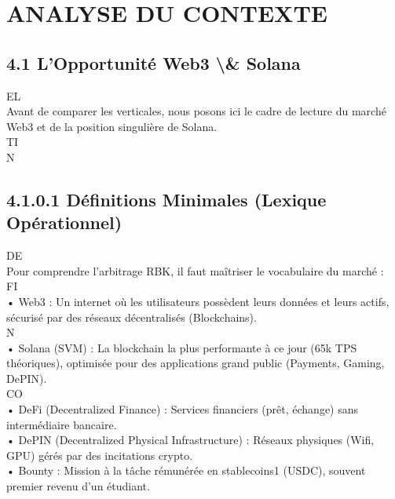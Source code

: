 \documentclass[12pt,landscape,a4paper]{article}
\begin{document}
\section{ANALYSE DU CONTEXTE}
\vspace{0.5em}
\vspace{0.5em}
\subsection{4.1 L’Opportunité Web3 \textbackslash{}& Solana}
\vspace{0.5em}
\vspace{0.5em}
\vspace{0.5em}
\vspace{0.5em}
EL\\
Avant de comparer les verticales, nous posons ici le cadre de lecture du marché Web3 et de la position singulière de Solana.\\
\vspace{0.5em}
\vspace{0.5em}
\vspace{0.5em}
\vspace{0.5em}
TI\\
N\\
\subsection{4.1.0.1 Définitions Minimales (Lexique Opérationnel)}
\vspace{0.5em}
\vspace{0.5em}
\vspace{0.5em}
\vspace{0.5em}
DE\\
Pour comprendre l’arbitrage RBK, il faut maîtriser le vocabulaire du marché :\\
\vspace{0.5em}
\vspace{0.5em}
\vspace{0.5em}
\vspace{0.5em}
FI\\
• Web3 : Un internet où les utilisateurs possèdent leurs données et leurs actifs, sécurisé par des réseaux décentralisés (Blockchains).\\
\vspace{0.5em}
\vspace{0.5em}
\vspace{0.5em}
\vspace{0.5em}
N\\
• Solana (SVM) : La blockchain la plus performante à ce jour (65k TPS théoriques), optimisée pour des applications grand public (Payments, Gaming, DePIN).\\
CO\\
• DeFi (Decentralized Finance) : Services financiers (prêt, échange) sans intermédiaire bancaire.\\
• DePIN (Decentralized Physical Infrastructure) : Réseaux physiques (Wifi, GPU) gérés par des incitations crypto.\\
• Bounty : Mission à la tâche rémunérée en stablecoins1 (USDC), souvent premier revenu d’un étudiant.\\
\vspace{0.5em}
\vspace{0.5em}
\end{document}
